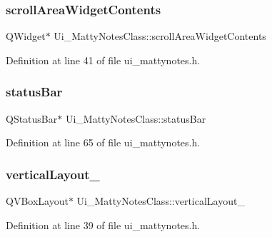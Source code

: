 \hypertarget{classUi__MattyNotesClass_ab89cebba84d5ea3e808da6d0db9d673c}{}\label{classUi__MattyNotesClass_ab89cebba84d5ea3e808da6d0db9d673c} 
\subsubsection{\texorpdfstring{scroll\+Area\+Widget\+Contents}{scrollAreaWidgetContents}}
{\footnotesize\ttfamily Q\+Widget$\ast$ Ui\+\_\+\+Matty\+Notes\+Class\+::scroll\+Area\+Widget\+Contents}



Definition at line 41 of file ui\+\_\+mattynotes.\+h.

\hypertarget{classUi__MattyNotesClass_a00010e0401915a0f78491262b87b807d}{}\label{classUi__MattyNotesClass_a00010e0401915a0f78491262b87b807d} 
\subsubsection{\texorpdfstring{status\+Bar}{statusBar}}
{\footnotesize\ttfamily Q\+Status\+Bar$\ast$ Ui\+\_\+\+Matty\+Notes\+Class\+::status\+Bar}



Definition at line 65 of file ui\+\_\+mattynotes.\+h.

\hypertarget{classUi__MattyNotesClass_a387c14ba400cb9ab0b33b5000276d66b}{}\label{classUi__MattyNotesClass_a387c14ba400cb9ab0b33b5000276d66b} 
\subsubsection{\texorpdfstring{vertical\+Layout\+\_}{verticalLayout\_3}}
{\footnotesize\ttfamily Q\+V\+Box\+Layout$\ast$ Ui\+\_\+\+Matty\+Notes\+Class\+::vertical\+Layout\+\_}



Definition at line 39 of file ui\+\_\+mattynotes.\+h.

